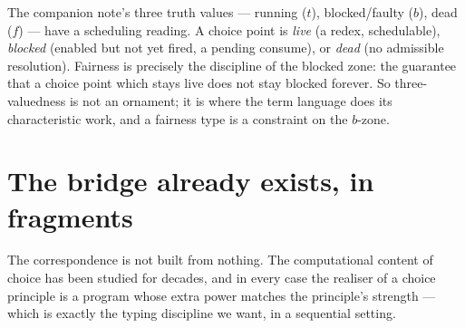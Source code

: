 \begin{remark}
The companion note's three truth values --- running ($t$), blocked/faulty ($b$), dead ($f$)
\cite{consensus} --- have a scheduling reading. A choice point is \emph{live} (a redex, schedulable),
\emph{blocked} (enabled but not yet fired, a pending consume), or \emph{dead} (no admissible
resolution). Fairness is precisely the discipline of the blocked zone: the guarantee that a choice
point which stays live does not stay blocked forever. So three-valuedness is not an ornament; it is
where the term language does its characteristic work, and a fairness type is a constraint on the
$b$-zone.
\end{remark}

\section{The bridge already exists, in fragments}\label{chs:sec:bridge}

The correspondence is not built from nothing. The computational content of choice has been studied
for decades, and in every case the realiser of a choice principle is a program whose extra power
matches the principle's strength --- which is exactly the typing discipline we want, in a sequential
setting.

